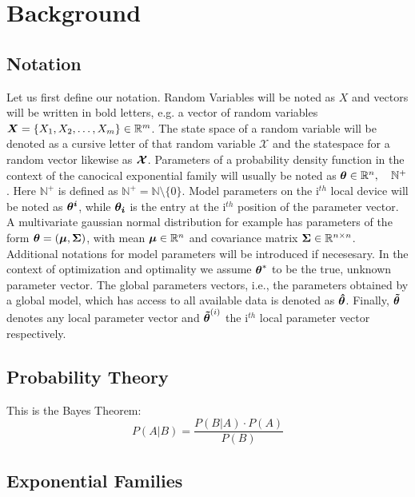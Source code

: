 \chapter{Background}
\label{chapter:kap2}

\section{Notation}
\label{sec:nota}
Let us first define our notation. 
Random Variables will be noted as $X$ and vectors will be written in bold letters, e.g. a vector of random variables $\boldsymbol{X} = \{X_1, X_2, \ldots, X_m\} \in \mathbb{R}^m$.
The state space of a random variable will be denoted as a cursive letter of that random variable $\mathcal{X}$ and the statespace for  a random vector likewise as $\boldsymbol{\mathcal{X}}$.
Parameters of a probability density function in the context of the canocical exponential family will usually be noted as $\boldsymbol{\theta} \in \mathbb{R}^n, \quad \mathbb{N}^+$.
Here $\mathbb{N}^+$ is defined as $ \mathbb{N}^+ = \mathbb{N} \setminus \{0\}$.
Model parameters on the i$^{th}$ local device will be noted as $\boldsymbol{\theta^i}$, while $\boldsymbol{\theta_i}$ is the entry at the i$^{th}$ position of the parameter vector.
A multivariate gaussian normal distribution for example has parameters of the form $\boldsymbol{\theta} = (\boldsymbol{\mu}, \boldsymbol{\Sigma})$, with mean $\boldsymbol{\mu} \in \mathbb{R}^{n}$ and covariance matrix $\boldsymbol{\Sigma} \in \mathbb{R}^{n \times n}$.
Additional notations for model parameters will be introduced if necesesary.
In the context of optimization and optimality we assume $\boldsymbol{\theta}^*$ to be the true, unknown parameter vector.
The global parameters vectors, i.e., the parameters obtained by a global model, which has access to all available data is denoted as  $\boldsymbol{\hat{\theta}}$.
Finally, $\boldsymbol{\tilde{\theta}}$ denotes any local parameter vector and $\boldsymbol{\tilde{\theta}}^{(i)}$ the i$^{th}$ local parameter vector respectively.


\section{Probability Theory}
This is the Bayes Theorem:
\begin{equation}
    P (A \lvert B) = \frac{P(B \lvert A) \cdot P(A)}{P(B)}
\end{equation}


\section{Exponential Families}
\label{sec:expf}

